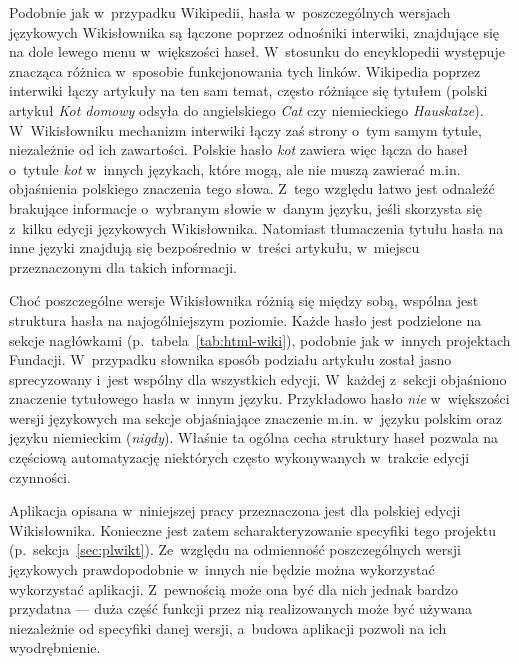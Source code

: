 Podobnie jak w~przypadku Wikipedii, hasła w~poszczególnych wersjach językowych Wikisłownika są łączone poprzez odnośniki interwiki, znajdujące się na dole lewego menu w~większości haseł. W~stosunku do encyklopedii występuje znacząca różnica w~sposobie funkcjonowania tych linków. Wikipedia poprzez interwiki łączy artykuły na ten sam temat, często różniące się tytułem (polski artykuł \emph{Kot domowy} odsyła do angielskiego \emph{Cat} czy niemieckiego \emph{Hauskatze}). W~Wikisłowniku mechanizm interwiki łączy zaś strony o~tym samym tytule, niezależnie od ich zawartości. Polskie hasło \emph{kot} zawiera więc łącza do haseł o~tytule \emph{kot} w~innych językach, które mogą, ale nie muszą zawierać m.in. objaśnienia polskiego znaczenia tego słowa. Z~tego względu łatwo jest odnaleźć brakujące informacje o~wybranym słowie w~danym języku, jeśli skorzysta się z~kilku edycji językowych Wikisłownika. Natomiast tłumaczenia tytułu hasła na inne języki znajdują się bezpośrednio w~treści artykułu, w~miejscu przeznaczonym dla takich informacji.

Choć poszczególne wersje Wikisłownika różnią się między sobą, wspólna jest struktura hasła na najogólniejszym poziomie. Każde hasło jest podzielone na sekcje nagłówkami (p.~tabela~\ref{tab:html-wiki}), podobnie jak w~innych projektach Fundacji. W~przypadku słownika sposób podziału artykułu został jasno sprecyzowany i~jest wspólny dla wszystkich edycji. W~każdej z~sekcji objaśniono znaczenie tytułowego hasła w~innym języku. Przykładowo hasło \emph{nie} w~większości wersji językowych ma sekcje objaśniające znaczenie m.in. w~języku polskim oraz języku niemieckim (\emph{nigdy}). Właśnie ta ogólna cecha struktury haseł pozwala na częściową automatyzację niektórych często wykonywanych w~trakcie edycji czynności.

Aplikacja opisana w~niniejszej pracy przeznaczona jest dla polskiej edycji Wikisłownika. Konieczne jest zatem scharakteryzowanie specyfiki tego projektu (p.~sekcja~\ref{sec:plwikt}). Ze~względu na odmienność poszczególnych wersji językowych prawdopodobnie w~innych nie będzie można wykorzystać wykorzystać aplikacji. Z~pewnością może ona być dla nich jednak bardzo przydatna --- duża część funkcji przez nią realizowanych może być używana niezależnie od specyfiki danej wersji, a~budowa aplikacji pozwoli na ich wyodrębnienie.

